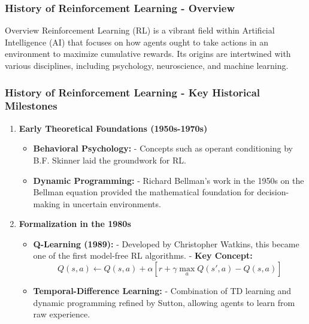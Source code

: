 \documentclass[aspectratio=169]{beamer}
\begin{document}
\begin{frame}[fragile]
    \frametitle{History of Reinforcement Learning - Overview}
    \begin{block}{Overview}
        Reinforcement Learning (RL) is a vibrant field within Artificial Intelligence (AI) that focuses on how agents ought to take actions in an environment to maximize cumulative rewards. Its origins are intertwined with various disciplines, including psychology, neuroscience, and machine learning.
    \end{block}
\end{frame}

\begin{frame}[fragile]
    \frametitle{History of Reinforcement Learning - Key Historical Milestones}
    \begin{enumerate}
        \item \textbf{Early Theoretical Foundations (1950s-1970s)}
        \begin{itemize}
            \item \textbf{Behavioral Psychology:}
            - Concepts such as operant conditioning by B.F. Skinner laid the groundwork for RL.
            \item \textbf{Dynamic Programming:}
            - Richard Bellman's work in the 1950s on the Bellman equation provided the mathematical foundation for decision-making in uncertain environments.
        \end{itemize}
        
        \item \textbf{Formalization in the 1980s}
        \begin{itemize}
            \item \textbf{Q-Learning (1989):}
            - Developed by Christopher Watkins, this became one of the first model-free RL algorithms.
            - \textbf{Key Concept:}
            \begin{equation}
                Q(s,a) \gets Q(s,a) + \alpha [r + \gamma \max_a Q(s',a) - Q(s,a)]
            \end{equation}

            \item \textbf{Temporal-Difference Learning:}
            - Combination of TD learning and dynamic programming refined by Sutton, allowing agents to learn from raw experience.
        \end{itemize}
    \end{enumerate}
\end{frame}
\end{document}
